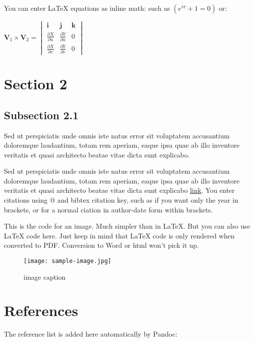\documentclass[a4paper,12pt]{article}
\begin{document}
You can enter LaTeX equations as inline math: such as
\(({e}^{i\pi }+1=0)\) or:

\(\mathbf{V}_1 \times \mathbf{V}_2 = \begin{vmatrix} \mathbf{i} & \mathbf{j} & \mathbf{k} \\ \frac{\partial X}{\partial u} & \frac{\partial Y}{\partial u} & 0 \\ \frac{\partial X}{\partial v} & \frac{\partial Y}{\partial v} & 0 \end{vmatrix}\)

\section{Section 2}\label{section-2}

\subsection{Subsection 2.1}\label{subsection-2.1}

Sed ut perspiciatis unde omnis iste natus error sit voluptatem
accusantium doloremque laudantium, totam rem aperiam, eaque ipsa quae ab
illo inventore veritatis et quasi architecto beatae vitae dicta sunt
explicabo.

Sed ut perspiciatis unde omnis iste natus error sit voluptatem
accusantium doloremque laudantium, totam rem aperiam, eaque ipsa quae ab
illo inventore veritatis et quasi architecto beatae vitae dicta sunt
explicabo \href{http://www.http://daringfireball.net}{link}. You enter
citations using @ and bibtex citation key, such as
\cite{donaldduck2014} if you want only the year in brackets, or
\cite{donaldduck2013} for a normal ciation in author-date form
within brackets.

This is the code for an image. Much simpler than in LaTeX. But you can
also use LaTeX code here. Just keep in mind that LaTeX code is only
rendered when converted to PDF. Conversion to Word or html won't pick it
up.

\begin{figure}[htbp]
\centering
\texttt{[image: sample-image.jpg]}
\caption{image caption}
\end{figure}

\section{References}\label{references}

The reference list is added here automatically by Pandoc:




\end{document}
